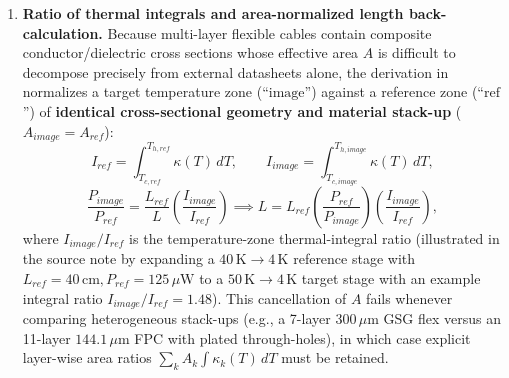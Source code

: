 \documentclass[11pt,a4paper]{article}
\begin{document}
\begin{enumerate}[leftmargin=*]
\item \textbf{Ratio of thermal integrals and area-normalized length back-calculation.} Because multi-layer flexible cables contain composite conductor/dielectric cross sections whose effective area $A$ is difficult to decompose precisely from external datasheets alone, the derivation in  normalizes a target temperature zone (``$\mathrm{image}$'') against a reference zone (``$\mathrm{ref}$'') of \textbf{identical cross-sectional geometry and material stack-up} ($A_{image}=A_{ref}$):
\begin{equation}
I_{ref}=\int_{T_{c,ref}}^{T_{h,ref}}\kappa(T)\,dT, \qquad I_{image}=\int_{T_{c,image}}^{T_{h,image}}\kappa(T)\,dT,
\end{equation}
\begin{equation}
\frac{P_{image}}{P_{ref}} = \frac{L_{ref}}{L}\left(\frac{I_{image}}{I_{ref}}\right) \implies L = L_{ref}\left(\frac{P_{ref}}{P_{image}}\right)\left(\frac{I_{image}}{I_{ref}}\right),
\end{equation}
where $I_{image}/I_{ref}$ is the temperature-zone thermal-integral ratio (illustrated in the source note by expanding a $40\,\mathrm{K}\to 4\,\mathrm{K}$ reference stage with $L_{ref}=40\,\mathrm{cm}, P_{ref}=125\,\mu\mathrm{W}$ to a $50\,\mathrm{K}\to 4\,\mathrm{K}$ target stage with an example integral ratio $I_{image}/I_{ref}=1.48$). This cancellation of $A$ fails whenever comparing heterogeneous stack-ups (e.g., a 7-layer $300\,\mu\mathrm{m}$ GSG flex versus an 11-layer $144.1\,\mu\mathrm{m}$ FPC with plated through-holes), in which case explicit layer-wise area ratios $\sum_k A_k\int\kappa_k(T)\,dT$ must be retained.


\end{enumerate}
\end{document}
